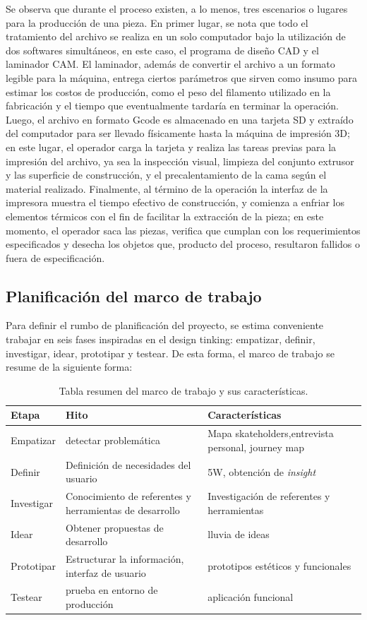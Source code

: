 Se observa que durante el proceso existen, a lo menos, tres escenarios o lugares para la producción de una pieza. En primer lugar, se nota que todo el tratamiento del archivo se realiza en un solo computador bajo la utilización de dos softwares simultáneos, en este caso, el programa de diseño CAD y el laminador CAM. El laminador, además de convertir el archivo a un formato legible para la máquina, entrega ciertos parámetros que sirven como insumo para estimar los costos de producción, como el peso del filamento utilizado en la fabricación y el tiempo que eventualmente tardaría en terminar la operación. Luego, el archivo en formato Gcode es almacenado en una tarjeta SD y extraído del computador para ser llevado físicamente hasta la máquina de impresión 3D; en este lugar, el operador carga la tarjeta y realiza las tareas previas para la impresión del archivo, ya sea la inspección visual, limpieza del conjunto extrusor y las superficie de construcción, y el precalentamiento de la cama según el material realizado. Finalmente, al término de la operación la interfaz de la impresora muestra el tiempo efectivo de construcción, y comienza a enfriar los elementos térmicos con el fin de facilitar la extracción de la pieza; en este momento, el operador saca las piezas, verifica que cumplan con los requerimientos especificados y desecha los objetos que, producto del proceso, resultaron fallidos o fuera de especificación. 

\subsection{Planificación del marco de trabajo}

Para definir el rumbo de planificación del proyecto, se estima conveniente trabajar en seis fases inspiradas en el design tinking: empatizar, definir, investigar, idear, prototipar y testear. De esta forma, el marco de trabajo se resume de la siguiente forma:

\begin{table}[H]
\centering
\begin{tabular}{|p{3.5cm}|p{3.5cm}|p{3.5cm}|}
\hline
Etapa & Hito & Características \\
\hline
Empatizar & detectar problemática & Mapa skateholders,entrevista personal, journey map \\
\hline
Definir & Definición de necesidades del usuario & 5W, obtención de \textit{insight}\\
\hline
Investigar & Conocimiento de referentes y herramientas de desarrollo & Investigación de referentes y herramientas \\
\hline
Idear & Obtener propuestas de desarrollo & lluvia de ideas \\
\hline
Prototipar & Estructurar la información, interfaz de usuario & prototipos estéticos y funcionales \\
\hline
Testear & prueba en entorno de producción & aplicación funcional \\
\hline

\end{tabular}
\caption{Tabla resumen del marco de trabajo y sus características.}
\end{table}

